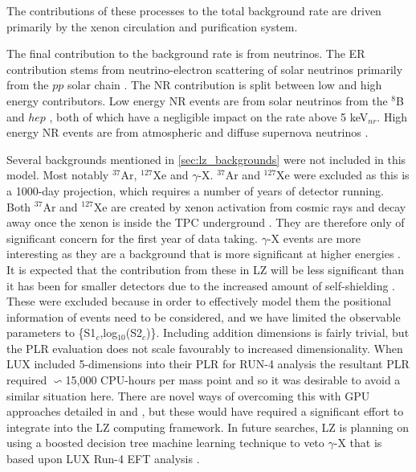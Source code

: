 The contributions of these processes to the total background rate are driven primarily by the xenon circulation and purification system. 
\par
The final contribution to the background rate is from neutrinos.
The ER contribution stems from neutrino-electron scattering of solar neutrinos primarily from the $pp$ solar chain \cite{solar_neutrinos_ref}.
The NR contribution is split between low and high energy contributors. 
Low energy NR events are from solar neutrinos from the $^{8}$B \cite{b8_neutrino_rate_ref} and $hep$ \cite{solar_neutrinos_rate_ref}, both of which have a negligible impact on the rate above 5 keV$_{nr}$.
High energy NR events are from atmospheric \cite{atmospheric_neutrinos_rate_ref} and diffuse supernova neutrinos \cite{dissuse_supernova_neutrinos_rate_ref}.
\par
Several backgrounds mentioned in \autoref{sec:lz_backgrounds} were not included in this model.
Most notably $^{37}$Ar, $^{127}$Xe and $\gamma$-X.
$^{37}$Ar and $^{127}$Xe were excluded as this is a 1000-day projection, which requires a number of years of detector running.
Both $^{37}$Ar and $^{127}$Xe are created by xenon activation from cosmic rays and decay away once the xenon is inside the TPC underground \cite{lz_argon37_ref, lux_xenon_activation_ref}.
They are therefore only of significant concern for the first year of data taking.
$\gamma$-X events are more interesting as they are a background that is more significant at higher energies \cite{gregrischbieter_thesis_ref}.
It is expected that the contribution from these in LZ will be less significant than it has been for smaller detectors due to the increased amount of self-shielding \cite{LZ_TechnicalDesignReview_ref}.
These were excluded because in order to effectively model them the positional information of events need to be considered, and we have limited the observable parameters to \{S1$_c$,log$_{10}$(S2$_c$)\}.
Including addition dimensions is fairly trivial, but the PLR evaluation does not scale favourably to increased dimensionality.
When LUX included 5-dimensions into their PLR for RUN-4 analysis the resultant PLR required $\backsim$15,000 CPU-hours per mass point \cite{billyboxer_thesis_ref} and so it was desirable to avoid a similar situation here.
There are novel ways of overcoming this with GPU approaches detailed in \cite{flamenest_ref} and \cite{lux_ml_plr_ref}, but these would have required a significant effort to integrate into the LZ computing framework.
In future searches, LZ is planning on using a boosted decision tree machine learning technique to veto $\gamma$-X that is based upon LUX Run-4 EFT analysis \cite{LUX_RUN4_EFT_2021}.

